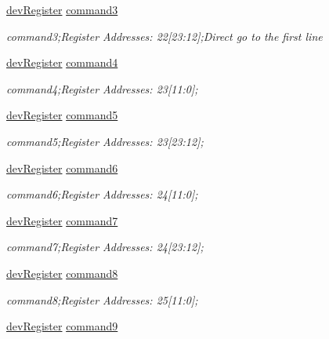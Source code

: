 \begin{DoxyCompactItemize}
\mbox{\hyperlink{classdev_register}{dev\+Register}} \mbox{\hyperlink{class_o_p_t3101_registers_a44ac4302e9725d53ff34c580a975c49d}{command3}}
\begin{DoxyCompactList}\small\item\em command3;Register Addresses\+: 22\mbox{[}23\+:12\mbox{]};Direct go to the first line \end{DoxyCompactList}\item 
\mbox{\hyperlink{classdev_register}{dev\+Register}} \mbox{\hyperlink{class_o_p_t3101_registers_aa4043e52e1a051353cdf8550a85853e0}{command4}}
\begin{DoxyCompactList}\small\item\em command4;Register Addresses\+: 23\mbox{[}11\+:0\mbox{]}; \end{DoxyCompactList}\item 
\mbox{\hyperlink{classdev_register}{dev\+Register}} \mbox{\hyperlink{class_o_p_t3101_registers_a762c792d69a50391048fea3e6050d5cd}{command5}}
\begin{DoxyCompactList}\small\item\em command5;Register Addresses\+: 23\mbox{[}23\+:12\mbox{]}; \end{DoxyCompactList}\item 
\mbox{\hyperlink{classdev_register}{dev\+Register}} \mbox{\hyperlink{class_o_p_t3101_registers_aabe00c6eb9a94d907bab6a1f067d2ea7}{command6}}
\begin{DoxyCompactList}\small\item\em command6;Register Addresses\+: 24\mbox{[}11\+:0\mbox{]}; \end{DoxyCompactList}\item 
\mbox{\hyperlink{classdev_register}{dev\+Register}} \mbox{\hyperlink{class_o_p_t3101_registers_a2868f59017de96becd9c727e821f71bd}{command7}}
\begin{DoxyCompactList}\small\item\em command7;Register Addresses\+: 24\mbox{[}23\+:12\mbox{]}; \end{DoxyCompactList}\item 
\mbox{\hyperlink{classdev_register}{dev\+Register}} \mbox{\hyperlink{class_o_p_t3101_registers_a89c1c2fc309ba7978d45ece0bb19899d}{command8}}
\begin{DoxyCompactList}\small\item\em command8;Register Addresses\+: 25\mbox{[}11\+:0\mbox{]}; \end{DoxyCompactList}\item 
\mbox{\hyperlink{classdev_register}{dev\+Register}} \mbox{\hyperlink{class_o_p_t3101_registers_aebd52ec3504753c2abaa0e28f4b688ca}{command9}}

\end{DoxyCompactItemize}
